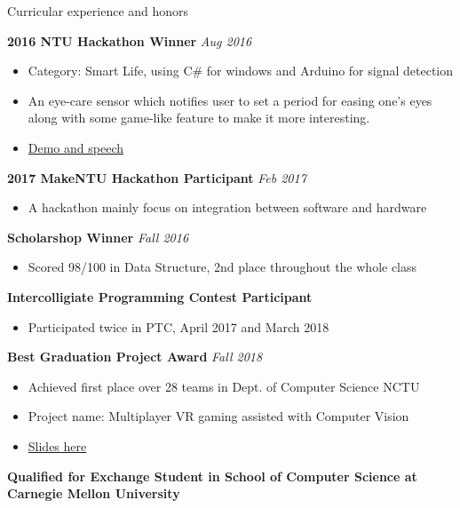 \documentclass{resume} %
\begin{document}
\begin{rSection}{Curricular experience and honors}

{\bf 2016 NTU Hackathon Winner} \hfill {\em Aug 2016}
\begin{itemize}
    \item Category: Smart Life, using C\# for windows and Arduino for signal detection 
    \item An eye-care sensor which notifies user to set a period for easing one's eyes along with some game-like feature to make it more interesting.
    \item \href{https://www.youtube.com/watch?v=LerD1-Vispg}{Demo and speech}
\end{itemize}

{\bf 2017 MakeNTU Hackathon Participant} \hfill {\em Feb 2017}
\begin{itemize}
    \item A hackathon mainly focus on integration between software and hardware 
\end{itemize}

{\bf Scholarshop Winner} \hfill {\em Fall 2016}
\begin{itemize}
    \item Scored 98/100 in Data Structure, 2nd place throughout the whole class 
\end{itemize}

{\bf Intercolligiate Programming Contest Participant}
\begin{itemize}
    \item Participated twice in PTC, April 2017 and March 2018
\end{itemize}

{\bf Best Graduation Project Award} \hfill {\em Fall 2018}
\begin{itemize}
    \item Achieved first place over 28 teams in Dept. of Computer Science NCTU
    \item Project name: Multiplayer VR gaming assisted with Computer Vision
    \item \href{https://github.com/kai0122/NCTU-CS-Graduation-Project?fbclid=IwAR3DxQrgYiWn7BxJb9AZVgITAuv5XSOHrdM8DTjRmwvZTLSyk_Wg-JlftW0}{Slides here} 
\end{itemize}

{\bf Qualified for Exchange Student in School of Computer Science at Carnegie Mellon University}
\end{rSection}
\end{document}
